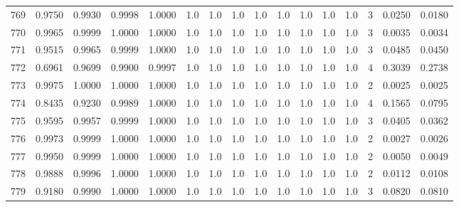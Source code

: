 \begin{tabular}{lrrrrrrrrrrrrrrr}
769 &      0.9750 &  0.9930 &  0.9998 &  1.0000 &     1.0 &     1.0 &     1.0 &     1.0 &     1.0 &     1.0 &      1.0 &        1.0 &      3 &                    0.0250 &                     0.0180 \\
770 &      0.9965 &  0.9999 &  1.0000 &  1.0000 &     1.0 &     1.0 &     1.0 &     1.0 &     1.0 &     1.0 &      1.0 &        1.0 &      3 &                    0.0035 &                     0.0034 \\
771 &      0.9515 &  0.9965 &  0.9999 &  1.0000 &     1.0 &     1.0 &     1.0 &     1.0 &     1.0 &     1.0 &      1.0 &        1.0 &      3 &                    0.0485 &                     0.0450 \\
772 &      0.6961 &  0.9699 &  0.9900 &  0.9997 &     1.0 &     1.0 &     1.0 &     1.0 &     1.0 &     1.0 &      1.0 &        1.0 &      4 &                    0.3039 &                     0.2738 \\
773 &      0.9975 &  1.0000 &  1.0000 &  1.0000 &     1.0 &     1.0 &     1.0 &     1.0 &     1.0 &     1.0 &      1.0 &        1.0 &      2 &                    0.0025 &                     0.0025 \\
774 &      0.8435 &  0.9230 &  0.9989 &  1.0000 &     1.0 &     1.0 &     1.0 &     1.0 &     1.0 &     1.0 &      1.0 &        1.0 &      4 &                    0.1565 &                     0.0795 \\
775 &      0.9595 &  0.9957 &  0.9999 &  1.0000 &     1.0 &     1.0 &     1.0 &     1.0 &     1.0 &     1.0 &      1.0 &        1.0 &      3 &                    0.0405 &                     0.0362 \\
776 &      0.9973 &  0.9999 &  1.0000 &  1.0000 &     1.0 &     1.0 &     1.0 &     1.0 &     1.0 &     1.0 &      1.0 &        1.0 &      2 &                    0.0027 &                     0.0026 \\
777 &      0.9950 &  0.9999 &  1.0000 &  1.0000 &     1.0 &     1.0 &     1.0 &     1.0 &     1.0 &     1.0 &      1.0 &        1.0 &      2 &                    0.0050 &                     0.0049 \\
778 &      0.9888 &  0.9996 &  1.0000 &  1.0000 &     1.0 &     1.0 &     1.0 &     1.0 &     1.0 &     1.0 &      1.0 &        1.0 &      2 &                    0.0112 &                     0.0108 \\
779 &      0.9180 &  0.9990 &  1.0000 &  1.0000 &     1.0 &     1.0 &     1.0 &     1.0 &     1.0 &     1.0 &      1.0 &        1.0 &      3 &                    0.0820 &                     0.0810 \\

\end{tabular}
